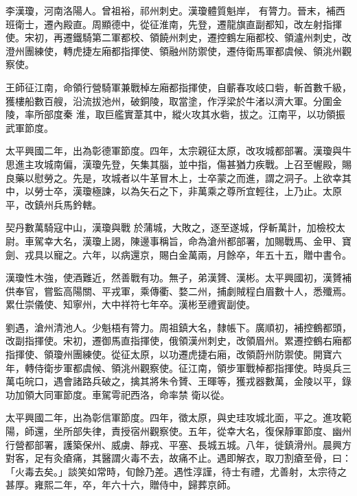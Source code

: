 \begin{pinyinscope}
 李漢瓊，河南洛陽人。曾祖裕，祁州刺史。漢瓊體質魁岸，
 有膂力。晉末，補西班衛士，遷內殿直。周顯德中，從征淮南，先登，遷龍旗直副都知，改左射指揮使。宋初，再遷鐵騎第二軍都校、領饒州刺史，遷控鶴左廂都校、領瀘州刺史，改澄州團練使，轉虎捷左廂都指揮使、領融州防禦使，遷侍衛馬軍都虞候、領洮州觀察使。



 王師征江南，命領行營騎軍兼戰棹左廂都指揮使，自蘄春攻岐口砦，斬首數千級，獲樓船數百艘，沿流拔池州，破銅陵，取當塗，作浮梁於牛渚以濟大軍。分圍金陵，率所部度秦
 淮，取巨艦實葦其中，縱火攻其水砦，拔之。江南平，以功領振武軍節度。



 太平興國二年，出為彰德軍節度。四年，太宗親征太原，改攻城都部署。漢瓊與牛思進主攻城南偏，漢瓊先登，矢集其腦，並中指，傷甚猶力疾戰。上召至幄殿，賜良藥以慰勞之。先是，攻城者以牛革冒木上，士卒蒙之而進，謂之洞子。上欲幸其中，以勞士卒，漢瓊極諫，以為矢石之下，非萬乘之尊所宜輕往，上乃止。太原平，改鎮州兵馬鈐轄。



 契丹數萬騎寇中山，漢瓊與戰
 於蒲城，大敗之，逐至遂城，俘斬萬計，加檢校太尉。車駕幸大名，漢瓊上謁，陳邊事稱旨，命為滄州都部署，加賜戰馬、金甲、寶劍、戎具以寵之。六年，以病還京，賜白金萬兩，月餘卒，年五十五，贈中書令。



 漢瓊性木強，使酒難近，然善戰有功。無子，弟漢贇、漢彬。太平興國初，漢贇補供奉官，嘗監高陽關、平戎軍，乘傳衢、婺二州，捕劇賊程白眉數十人，悉殲焉。累仕崇儀使、知寧州，大中祥符七年卒。漢彬至禮賓副使。



 劉遇，滄州清池人。少魁梧有膂力。周祖鎮大名，隸帳下。廣順初，補控鶴都頭，改副指揮使。宋初，遷御馬直指揮使，俄領漢州刺史，改領眉州。累遷控鶴右廂都指揮使、領瓊州團練使。從征太原，以功遷虎捷右廂，改領蔚州防禦使。開寶六年，轉侍衛步軍都虞候、領洮州觀察使。征江南，領步軍戰棹都指揮使。時吳兵三萬屯皖口，遇會諸路兵破之，擒其將朱令贇、王暉等，獲戎器數萬，金陵以平，錄功加領大同軍節度。車駕雩祀西洛，命率禁
 衛以從。



 太平興國二年，出為彰信軍節度。四年，徵太原，與史珪攻城北面，平之。進攻範陽，師還，坐所部失律，責授宿州觀察使。五年，從幸大名，復保靜軍節度、幽州行營都部署，護築保州、威虜、靜戎、平塞、長城五城。八年，徙鎮滑州。晨興方對客，足有灸瘡痛，其醫謂火毒不去，故痛不止。遇即解衣，取刀割瘡至骨，曰：「火毒去矣。」談笑如常時，旬餘乃差。遇性淳謹，待士有禮，尤善射，太宗待之甚厚。雍熙二年，卒，年六十六，贈侍中，歸葬京師。




\end{pinyinscope}
